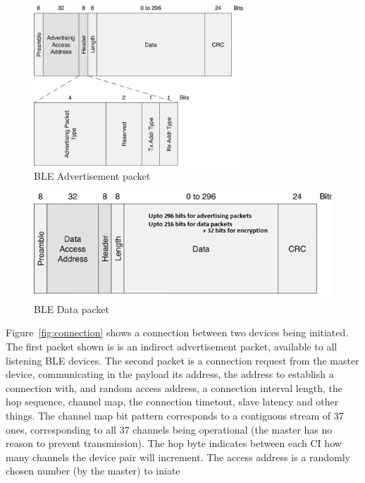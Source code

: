 \documentclass[]{article}
\begin{document}
\begin{figure}[htb]
	\begin{center}
		\includegraphics[width = 0.7\textwidth]{advertisement}
	\end{center}
	\caption{\ac{BLE} Advertisement packet}
	\label{fig:advertisement}
\end{figure}

\begin{figure}[htb]
	\begin{center}
		\includegraphics[width = 1\textwidth]{data}
	\end{center}
	\caption{\ac{BLE} Data packet}
	\label{fig:data}
\end{figure}

Figure~\ref{fig:connection} shows a connection between two devices being initiated. The first packet shown is is an indirect advertisement packet, available to all listening \ac{BLE} devices. The second packet is a connection request from the master device, communicating in the payload its address, the address to establish a connection with, and random access address, a connection interval length, the hop sequence, channel map, the connection timetout, slave latency and other things. The channel map bit pattern corresponds to a contiguous stream of 37 ones, corresponding to all 37 channels being operational (the master has no reason to prevent transmission). The hop byte indicates between each \ac{CI} how many channels the device pair will increment. The access address is a randomly chosen number (by the master) to iniate 
\end{document}
